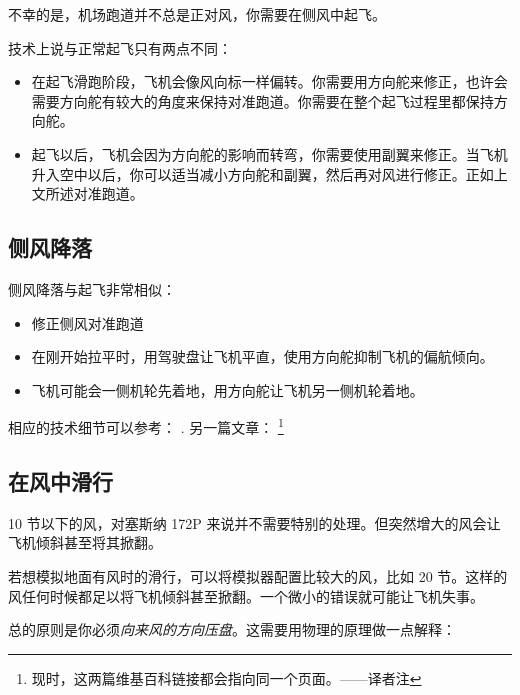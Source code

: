 \begin{itemize}
不幸的是，机场跑道并不总是正对风，你需要在侧风中起飞。

技术上说与正常起飞只有两点不同：
\begin{itemize}
    \item 在起飞滑跑阶段，飞机会像风向标一样偏转。你需要用方向舵来修正，也许会需要方向舵有较大的角度来保持对准跑道。你需要在整个起飞过程里都保持方向舵。
    \item 起飞以后，飞机会因为方向舵的影响而转弯，你需要使用副翼来修正。当飞机升入空中以后，你可以适当减小方向舵和副翼，然后再对风进行修正。正如上文所述对准跑道。
\end{itemize}

\subsection{侧风降落}
\label{sec:Lwsw}

侧风降落与起飞非常相似：

\begin{itemize}
    \item 修正侧风对准跑道
    \item 在刚开始拉平时，用驾驶盘让飞机平直，使用方向舵抑制飞机的偏航倾向。
    \item 飞机可能会一侧机轮先着地，用方向舵让飞机另一侧机轮着地。
\end{itemize}

相应的技术细节可以参考：
.
另一篇文章：
\footnote{现时，这两篇维基百科链接都会指向同一个页面。——译者注}

\subsection{在风中滑行}
\label{sec:Twsw}

10 节以下的风，对塞斯纳 172P 来说并不需要特别的处理。但突然增大的风会让飞机倾斜甚至将其掀翻。

若想模拟地面有风时的滑行，可以将模拟器配置比较大的风，比如 20 节。这样的风任何时候都足以将飞机倾斜甚至掀翻。一个微小的错误就可能让飞机失事。

总的原则是你必须\emph{向来风的方向压盘}。这需要用物理的原理做一点解释：


\end{itemize}
